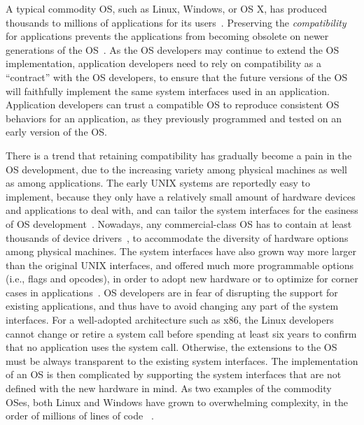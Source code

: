 A typical commodity OS, such as Linux, Windows, or OS X, has produced
thousands to millions of  applications for its users~\cite{ubuntu-packages,ms-by-number}.
Preserving the {\em compatibility} for applications prevents the applications from becoming obsolete on newer generations of the OS~\cite{mckusick1996design}.
As the OS developers may continue to extend the OS implementation,
application developers need to rely on compatibility as a ``contract'' with the OS developers, to ensure that the future versions of the OS will faithfully implement the same system interfaces used in an application.
Application developers can trust a compatible OS to reproduce consistent OS behaviors for an application, as they previously programmed and tested on an early version of the OS.


There is a trend that retaining compatibility has gradually become a pain in the OS development, due to the increasing variety among physical machines as well as among applications.
The early UNIX systems are reportedly easy to implement, because they only have a relatively small amount of hardware devices and applications to deal with, and can tailor the system interfaces for the easiness of OS development~\cite{ritchie78unix-retro}.
Nowadays, any commercial-class OS has to contain at least thousands of device drivers~\cite{padioleau2008linux-device-drivers}, to accommodate the diversity of hardware options among physical machines.
The system interfaces have also grown way more larger than the original UNIX interfaces, and offered much more programmable options (i.e., flags and opcodes),
in order to adopt new hardware or
to optimize for corner cases in applications~\cite{linux-man-syscall,win-api,ieee-posix}.
OS developers are in fear of disrupting the support for existing applications, and thus have to avoid changing any part of the system interfaces.
For a well-adopted architecture such as x86, the Linux developers cannot change or retire a system call before spending at least six years to confirm that no application uses the system call.
Otherwise, the extensions to the OS must be always transparent to the existing system interfaces.
The implementation of an OS is then complicated
by supporting the system interfaces that are not defined with the new hardware in mind.
As two examples of the commodity OSes, both Linux and Windows have grown to overwhelming complexity,
in the order of millions of lines of code
~\cite{tanenbaum2006os,kroah2007linux,cusumano1997microsoft}.

